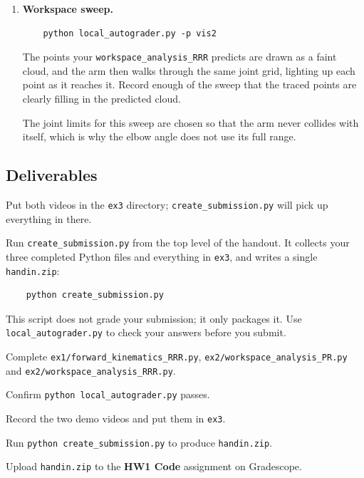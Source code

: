 \documentclass{16384_doc}
\begin{document}
\begin{questions}
\begin{enumerate}
    \item \textbf{Workspace sweep.}

\begin{verbatim}
    python local_autograder.py -p vis2
\end{verbatim}

    The points your \verb!workspace_analysis_RRR! predicts are drawn as a faint
    cloud, and the arm then walks through the same joint grid, lighting up each
    point as it reaches it. Record enough of the sweep that the traced points
    are clearly filling in the predicted cloud.

    The joint limits for this sweep are chosen so that the arm never collides
    with itself, which is why the elbow angle does not use its full range.
\end{enumerate}

\subsection*{Deliverables}

Put both videos in the \verb!ex3! directory; \verb!create_submission.py! will
pick up everything in there. 

Run \verb!create_submission.py! from the top level of the handout. It collects
your three completed Python files and everything in \verb!ex3!, and writes a
single \verb!handin.zip!:

\begin{verbatim}
    python create_submission.py
\end{verbatim}


This script does not grade your submission; it only packages it. Use
\verb!local_autograder.py! to check your answers before you submit.

\end{questions}

\begin{submissionChecklist}
    \item Complete \verb!ex1/forward_kinematics_RRR.py!,
        \verb!ex2/workspace_analysis_PR.py! and
        \verb!ex2/workspace_analysis_RRR.py!.
    \item Confirm \verb!python local_autograder.py! passes.
    \item Record the two demo videos and put them in \verb!ex3!.
    \item Run \verb!python create_submission.py! to produce \verb!handin.zip!.
    \item Upload \verb!handin.zip! to the \textbf{HW1 Code} assignment on
        Gradescope.
\end{submissionChecklist}
\end{document}
